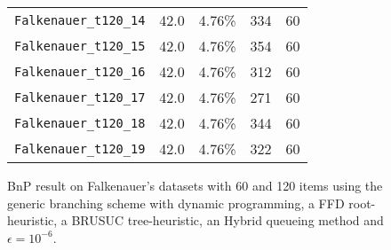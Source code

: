 \begin{figure}[!ht]
{\begin{minipage}{0.47\linewidth}
\begin{tabular}{|ccccc|}
			\texttt{Falkenauer\_t120\_14} & 42.0           & 4.76\% & 334             & 60      \\
			\texttt{Falkenauer\_t120\_15} & 42.0           & 4.76\% & 354             & 60      \\
			\texttt{Falkenauer\_t120\_16} & 42.0           & 4.76\% & 312             & 60      \\
			\texttt{Falkenauer\_t120\_17} & 42.0           & 4.76\% & 271             & 60      \\
			\texttt{Falkenauer\_t120\_18} & 42.0           & 4.76\% & 344             & 60     \\
			\texttt{Falkenauer\_t120\_19} & 42.0           & 4.76\% & 322             & 60      \\
			\hline
		\end{tabular}
	\end{minipage}
	}
	\caption{BnP result on Falkenauer's datasets with 60 and 120 items using the generic branching scheme with dynamic programming, a FFD root-heuristic, a BRUSUC tree-heuristic, an Hybrid queueing method and $\epsilon=10^{-6}$.}
\end{figure}
\newpage
